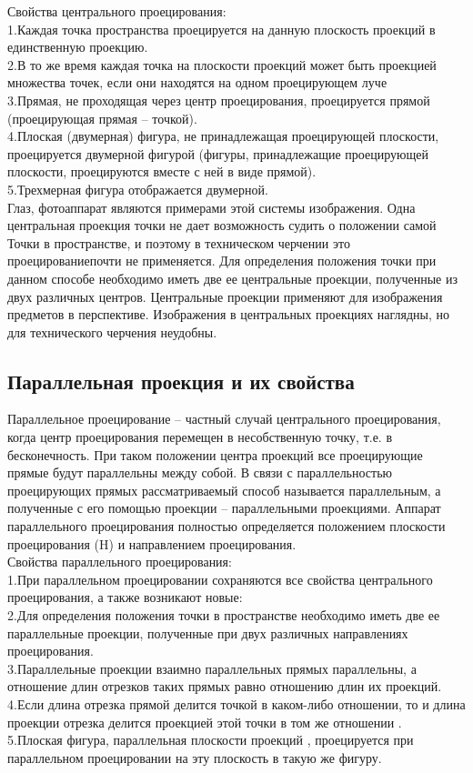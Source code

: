 \documentclass[a4paper, 12pt]{article}
\begin{document}
Свойства центрального проецирования:\\
1.Каждая точка пространства проецируется на данную плоскость проекций в единственную проекцию.\\
2.В то же время каждая точка на плоскости проекций может быть проекцией множества точек, если они находятся на одном проецирующем луче\\
3.Прямая, не проходящая через центр проецирования, проецируется прямой (проецирующая прямая – точкой).\\
4.Плоская (двумерная) фигура, не принадлежащая проецирующей плоскости, проецируется двумерной фигурой (фигуры, принадлежащие проецирующей плоскости, проецируются вместе с ней в виде прямой).\\
5.Трехмерная фигура отображается двумерной.\\
Глаз, фотоаппарат являются примерами этой системы изображения. Одна центральная проекция точки не дает возможность судить о положении самой Точки в пространстве, и поэтому в техническом черчении это проецированиепочти не применяется. Для определения положения точки при данном способе необходимо иметь две ее центральные проекции, полученные из двух различных центров. Центральные проекции применяют для изображения предметов в перспективе. Изображения в центральных проекциях наглядны, но для технического черчения неудобны.

\subsection{Параллельная проекция и их свойства}
Параллельное проецирование – частный случай центрального проецирования, когда центр проецирования перемещен в несобственную точку, т.е. в бесконечность. При таком положении центра проекций все проецирующие прямые будут параллельны между собой. В связи с параллельностью проецирующих прямых рассматриваемый способ называется параллельным, а полученные с его помощью проекции – параллельными проекциями. Аппарат параллельного проецирования полностью определяется положением плоскости проецирования (H) и направлением проецирования.\\

Свойства параллельного проецирования:\\
1.При параллельном проецировании сохраняются все свойства центрального проецирования, а также возникают новые:\\
2.Для определения положения точки в пространстве необходимо иметь две ее параллельные проекции, полученные при двух различных направлениях проецирования.\\
3.Параллельные проекции взаимно параллельных прямых параллельны, а отношение длин отрезков таких прямых равно отношению длин их проекций.\\
4.Если длина отрезка прямой делится точкой в каком-либо отношении, то и длина проекции отрезка делится проекцией этой точки в том же отношении .\\
5.Плоская фигура, параллельная плоскости проекций , проецируется при параллельном проецировании на эту плоскость в такую же фигуру.\\
\end{document}
